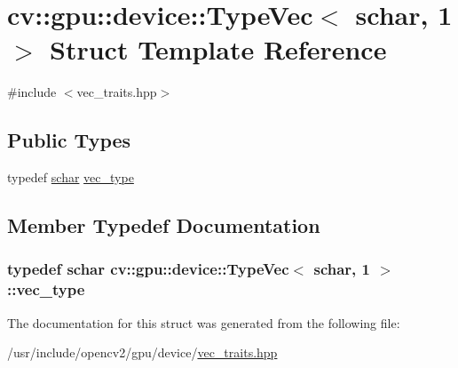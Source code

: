 \hypertarget{structcv_1_1gpu_1_1device_1_1TypeVec_3_01schar_00_011_01_4}{\section{cv\-:\-:gpu\-:\-:device\-:\-:Type\-Vec$<$ schar, 1 $>$ Struct Template Reference}
\label{structcv_1_1gpu_1_1device_1_1TypeVec_3_01schar_00_011_01_4}
}


{\ttfamily \#include $<$vec\-\_\-traits.\-hpp$>$}

\subsection*{Public Types}
\begin{DoxyCompactItemize}
\item 
typedef \hyperlink{core_2types__c_8h_a0fd9ce9d735064461bebfe6037026093}{schar} \hyperlink{structcv_1_1gpu_1_1device_1_1TypeVec_3_01schar_00_011_01_4_afd9d5ad04ac80bef6a70590b7c461d4b}{vec\-\_\-type}
\end{DoxyCompactItemize}


\subsection{Member Typedef Documentation}
\hypertarget{structcv_1_1gpu_1_1device_1_1TypeVec_3_01schar_00_011_01_4_afd9d5ad04ac80bef6a70590b7c461d4b}{
\subsubsection[{vec\-\_\-type}]{\setlength{\rightskip}{0pt plus 5cm}typedef {\bf schar} {\bf cv\-::gpu\-::device\-::\-Type\-Vec}$<$ {\bf schar}, 1 $>$\-::{\bf vec\-\_\-type}}}\label{structcv_1_1gpu_1_1device_1_1TypeVec_3_01schar_00_011_01_4_afd9d5ad04ac80bef6a70590b7c461d4b}


The documentation for this struct was generated from the following file\-:\begin{DoxyCompactItemize}
\item 
/usr/include/opencv2/gpu/device/\hyperlink{vec__traits_8hpp}{vec\-\_\-traits.\-hpp}\end{DoxyCompactItemize}
